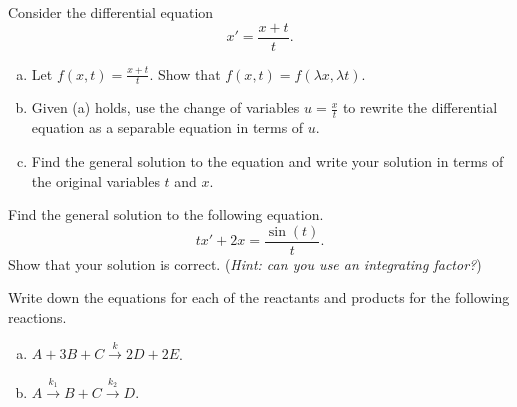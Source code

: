 \begin{problem}
Consider the differential equation
\[
x'=\frac{x+t}{t}.
\]
\begin{enumerate}[(a)]
    \item Let $f(x,t)=\frac{x+t}{t}$. Show that $f(x,t)=f(\lambda x, \lambda t)$.
    \item Given (a) holds, use the change of variables $u=\frac{x}{t}$ to rewrite the differential equation as a separable equation in terms of $u$.
    \item Find the general solution to the equation and write your solution in terms of the original variables $t$ and $x$.
\end{enumerate}
\end{problem}

\begin{problem}
Find the general solution to the following equation.
\[
tx'+2x=\frac{\sin(t)}{t}.
\]
Show that your solution is correct. (\emph{Hint: can you use an integrating factor?})
\end{problem}

\begin{problem}
Write down the equations for each of the reactants and products for the following reactions.
\begin{enumerate}[(a)]
    \item $A + 3B + C \xrightarrow{k} 2D+2E$.
    \item $A \xrightarrow{k_1} B + C \xrightarrow{k_2} D$.
\end{enumerate}
\end{problem}

